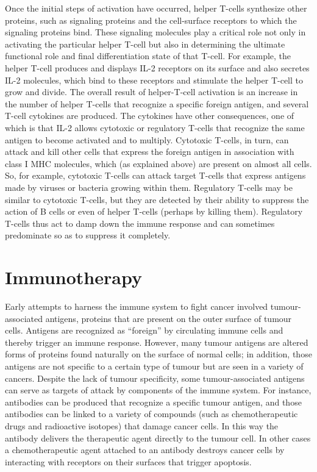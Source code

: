 Once the initial steps of activation have occurred, helper T-cells synthesize other proteins, such as signaling proteins and the cell-surface receptors to which the signaling proteins bind. These signaling molecules play a critical role not only in activating the particular helper T-cell but also in determining the ultimate functional role and final differentiation state of that T-cell. For example, the helper T-cell produces and displays IL-2 receptors on its surface and also secretes IL-2 molecules, which bind to these receptors and stimulate the helper T-cell to grow and divide.
The overall result of helper-T-cell activation is an increase in the number of helper T-cells that recognize a specific foreign antigen, and several T-cell cytokines are produced. The cytokines have other consequences, one of which is that IL-2 allows cytotoxic or regulatory T-cells that recognize the same antigen to become activated and to multiply. Cytotoxic T-cells, in turn, can attack and kill other cells that express the foreign antigen in association with class I MHC molecules, which (as explained above) are present on almost all cells. So, for example, cytotoxic T-cells can attack target T-cells that express antigens made by viruses or bacteria growing within them. Regulatory T-cells may be similar to cytotoxic T-cells, but they are detected by their ability to suppress the action of B cells or even of helper T-cells (perhaps by killing them). Regulatory T-cells thus act to damp down the immune response and can sometimes predominate so as to suppress it completely.

\section{Immunotherapy}
Early attempts to harness the immune system to fight cancer involved tumour-associated antigens, proteins that are present on the outer surface of tumour cells. Antigens are recognized as “foreign” by circulating immune cells and thereby trigger an immune response. However, many tumour antigens are altered forms of proteins found naturally on the surface of normal cells; in addition, those antigens are not specific to a certain type of tumour but are seen in a variety of cancers. Despite the lack of tumour specificity, some tumour-associated antigens can serve as targets of attack by components of the immune system. For instance, antibodies can be produced that recognize a specific tumour antigen, and those antibodies can be linked to a variety of compounds (such as chemotherapeutic drugs and radioactive isotopes) that damage cancer cells. In this way the antibody delivers the therapeutic agent directly to the tumour cell. In other cases a chemotherapeutic agent attached to an antibody destroys cancer cells by interacting with receptors on their surfaces that trigger apoptosis.

